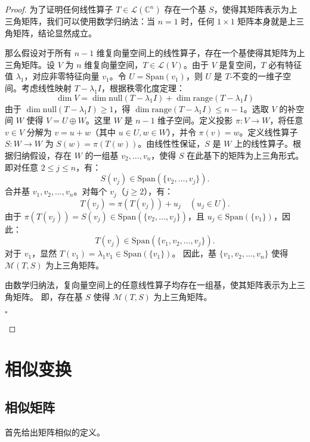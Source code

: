 \begin{proof}
	为了证明任何线性算子 $ T \in \mathcal{L}(\mathbb{C}^n) $ 存在一个基 $ S $，使得其矩阵表示为上三角矩阵，我们可以使用数学归纳法：当 $ n=1 $ 时，任何 $ 1 \times 1 $ 矩阵本身就是上三角矩阵，结论显然成立。

	那么假设对于所有 $ n-1 $ 维复向量空间上的线性算子，存在一个基使得其矩阵为上三角矩阵。设 $ V $ 为 $ n $ 维复向量空间，$ T \in \mathcal{L}(V) $。由于 $ V $ 是复空间，$ T $ 必有特征值 $ \lambda_1 $，对应非零特征向量 $ v_1 $。令 $ U = \text{Span}(v_1) $，则 $ U $ 是 $ T $-不变的一维子空间。考虑线性映射 $ T - \lambda_1 I $，根据秩零化度定理：$$\dim V = \dim \text{null}(T - \lambda_1 I) + \dim \text{range}(T - \lambda_1 I)$$由于 $ \dim \text{null}(T - \lambda_1 I) \geq 1 $，得 $ \dim \text{range}(T - \lambda_1 I) \leq n - 1 $。选取 $ V $ 的补空间 $ W $ 使得 $ V = U \oplus W $。这里 $ W $ 是 $ n-1 $ 维子空间。定义投影 $ \pi: V \to W $，将任意 $ v \in V $ 分解为 $ v = u + w $（其中 $ u \in U, w \in W $），并令 $ \pi(v) = w $。定义线性算子 $ S: W \to W $ 为 $ S(w) = \pi(T(w)) $。由线性性保证，$ S $ 是 $ W $ 上的线性算子。根据归纳假设，存在 $ W $ 的一组基 $ v_2, \dots, v_n $，使得 $ S $ 在此基下的矩阵为上三角形式。即对任意 $ 2 \leq j \leq n $，有：$$S(v_j) \in \text{Span}(\{v_2, \dots, v_j\}).$$合并基 $ v_1, v_2, \dots, v_n $。对每个 $ v_j $（$ j \geq 2 $），有：  
$$
T(v_j) = \pi(T(v_j)) + u_j \quad (u_j \in U).
$$
由于 $ \pi(T(v_j)) = S(v_j) \in \text{Span}(\{v_2, \dots, v_j\}) $，且 $ u_j \in \text{Span}(\{v_1\}) $，因此：  
$$
T(v_j) \in \text{Span}(\{v_1, v_2, \dots, v_j\}).
$$
对于 $ v_1 $，显然 $ T(v_1) = \lambda_1 v_1 \in \text{Span}(\{v_1\}) $。  
因此，基 $ \{v_1, v_2, \dots, v_n\} $ 使得 $ \mathcal{M}(T, S) $ 为上三角矩阵。

由数学归纳法，复向量空间上的任意线性算子均存在一组基，使其矩阵表示为上三角矩阵。  
即，存在基 $ S $ 使得 $ \mathcal{M}(T, S) $ 为上三角矩阵。
\begin{flushright}
		$\square$
	\end{flushright}
\end{proof}

\section{相似变换}

\subsection{相似矩阵}

首先给出矩阵相似的定义。

